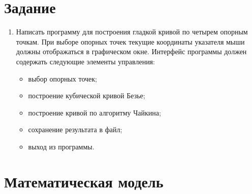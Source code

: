 \documentclass[14pt, a4paper]{extreport}
\begin{document}
\author{Савонин~М.В.}
\maketitle

\chapter{Задание}

\begin{enumerate}

	\item
	Написать программу для построения гладкой кривой по четырем опорным точкам. При выборе опорных точек текущие координаты указателя мыши 	должны отображаться в графическом окне. Интерфейс программы должен содержать следующие элементы управления:
	\begin{itemize}
		\item выбор опорных точек;
		\item построение кубической кривой Безье;
		\item построение кривой по алгоритму Чайкина;
		\item сохранение результата в файл;
		\item выход из программы.
	\end{itemize}

\end{enumerate}

\chapter{Математическая модель}
\end{document}

